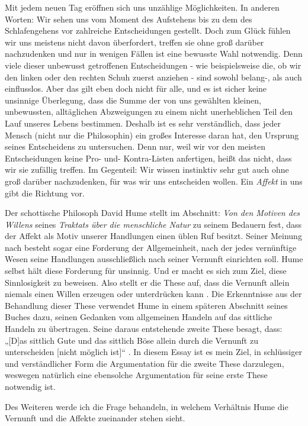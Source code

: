 \documentclass[ngerman,12pt]{diazessay} %
\begin{document}
\begin{doublespace}
Mit jedem neuen Tag eröffnen sich uns unzählige Möglichkeiten. In anderen Worten: Wir sehen uns vom Moment des Aufstehens bis zu dem des Schlafengehens vor zahlreiche Entscheidungen gestellt. Doch zum Glück fühlen wir uns meistens nicht davon überfordert, treffen sie ohne groß darüber nachzudenken und nur in wenigen Fällen ist eine bewusste Wahl notwendig. Denn viele dieser unbewusst getroffenen Entscheidungen - wie beispielsweise die, ob wir den linken oder den rechten Schuh zuerst anziehen - sind sowohl belang-, als auch einflusslos. Aber das gilt eben doch nicht für alle, und es ist sicher keine unsinnige Überlegung, dass die Summe der von uns gewählten kleinen, unbewussten, alltäglichen Abzweigungen zu einem nicht unerheblichen Teil den Lauf unseres Lebens bestimmen. Deshalb ist es sehr verständlich, dass jeder Mensch (nicht nur die Philosophin) ein großes Interesse daran hat, den Ursprung seines Entscheidens zu untersuchen. Denn nur, weil wir vor den meisten Entscheidungen keine Pro- und- Kontra-Listen anfertigen, heißt das nicht, dass wir sie zufällig treffen. Im Gegenteil: Wir wissen instinktiv sehr gut auch ohne groß darüber nachzudenken, für was wir uns entscheiden wollen. Ein \textit{Affekt} in uns gibt die Richtung vor.
\par\bigskip   
Der schottische Philosoph David Hume stellt im Abschnitt: \textit{Von den Motiven des Willens} seines \textit{Traktats über die menschliche Natur} zu seinem Bedauern fest, dass der Affekt als Motiv unserer Handlungen einen üblen Ruf besitzt. Seiner Meinung nach besteht sogar eine Forderung der Allgemeinheit, nach der jedes vernünftige Wesen seine Handlungen ausschließlich nach seiner Vernunft einrichten soll. Hume selbst hält diese Forderung für unsinnig. Und er macht es sich zum Ziel, diese Sinnlosigkeit zu beweisen. Also stellt er die These auf, dass die Vernunft allein niemals einen Willen erzeugen oder unterdrücken kann \cite[siehe S.484]{Hume.2013}. Die Erkenntnisse aus der Behandlung dieser These verwendet Hume in einem späteren Abschnitt seines Buches dazu, seinen Gedanken vom allgemeinen Handeln auf das sittliche Handeln zu übertragen. Seine daraus entstehende zweite These besagt, dass: „[D]as sittlich Gute und das sittlich Böse allein durch die Vernunft zu unterscheiden [nicht möglich ist]“ \cite[S.433]{Hume.2013}. In diesem Essay ist es mein Ziel, in schlüssiger und verständlicher Form die Argumentation für die zweite These darzulegen, weswegen natürlich eine ebensolche Argumentation für seine erste These notwendig ist.
\par\bigskip   
Des Weiteren werde ich die Frage behandeln, in welchem Verhältnis Hume die Vernunft und die Affekte zueinander stehen sieht.


\end{doublespace}
\end{document}
